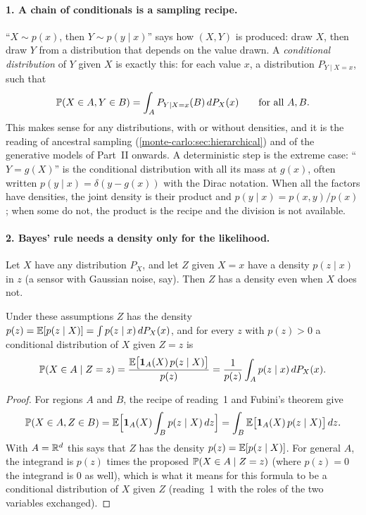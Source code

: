 \begin{notechapter}
\paragraph{1. A chain of conditionals is a sampling recipe.} ``$X\sim p(x)$, then $Y\sim p(y\mid x)$'' says
how $(X, Y)$ is produced: draw $X$, then draw $Y$ from a distribution that depends on the value drawn. A
\emph{conditional distribution} of $Y$ given $X$ is exactly this: for each value $x$, a distribution
$P_{Y\mid X = x}$, such that
\[
  \mathbb{P}(X\in A, Y\in B) = \int_AP_{Y\mid X = x}(B)\,dP_X(x)\qquad\text{for all }A, B .
\]
This makes sense for any distributions, with or without densities, and it is the reading of ancestral
sampling (\cref{monte-carlo:sec:hierarchical}) and of the generative models of Part~II onwards. A
deterministic step is the extreme case: ``$Y = g(X)$'' is the conditional distribution with all its mass at
$g(x)$, often written $p(y\mid x) = \delta(y - g(x))$ with the Dirac notation. When all the factors have densities,
the joint density is their product and $p(y\mid x) = p(x, y)/p(x)$; when some do not, the product is the
recipe and the division is not available.

\paragraph{2. Bayes' rule needs a density only for the likelihood.} Let $X$ have any distribution $P_X$, and
let $Z$ given $X = x$ have a density $p(z\mid x)$ in $z$ (a sensor with Gaussian noise, say). Then $Z$ has a
density even when $X$ does not.

\begin{proposition}\label{distributions-densities:prop:bayes}
Under these assumptions $Z$ has the density $p(z) = \mathbb{E}[p(z\mid X)] = \int p(z\mid x)\,dP_X(x)$, and for every $z$ with
$p(z) > 0$ a conditional distribution of $X$ given $Z = z$ is
\[
  \mathbb{P}(X\in A\mid Z = z) = \frac{\mathbb{E}\bigl[\mathbf{1}_A(X)\,p(z\mid X)\bigr]}{p(z)}
  = \frac{1}{p(z)}\int_Ap(z\mid x)\,dP_X(x) .
\]
\end{proposition}

\begin{proof}
For regions $A$ and $B$, the recipe of reading~1 and Fubini's theorem give
\[
  \mathbb{P}(X\in A, Z\in B) = \mathbb{E}\Bigl[\mathbf{1}_A(X)\int_Bp(z\mid X)\,dz\Bigr]
  = \int_B\mathbb{E}\bigl[\mathbf{1}_A(X)\,p(z\mid X)\bigr]\,dz .
\]
With $A = \mathbb{R}^d$ this says that $Z$ has the density $p(z) = \mathbb{E}[p(z\mid X)]$. For general $A$, the integrand is
$p(z)$ times the proposed $\mathbb{P}(X\in A\mid Z = z)$ (where $p(z) = 0$ the integrand is $0$ as well), which is what
it means for this formula to be a conditional distribution of $X$ given $Z$ (reading~1 with the roles of
the two variables exchanged).
\end{proof}


\end{notechapter}
